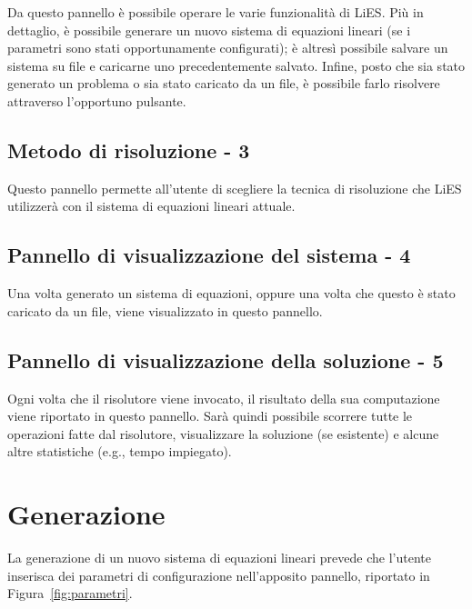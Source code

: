 \documentclass{article}
\begin{document}
Da questo pannello è possibile operare le varie funzionalità di LiES. Più in dettaglio, è possibile generare un nuovo sistema di equazioni lineari (se i parametri sono stati opportunamente configurati); è altresì possibile salvare un sistema su file e caricarne uno precedentemente salvato. Infine, posto che sia stato generato un problema o sia stato caricato da un file, è possibile farlo risolvere attraverso l'opportuno pulsante.

\subsection{Metodo di risoluzione - 3}

Questo pannello permette all'utente di scegliere la tecnica di risoluzione che LiES utilizzerà con il sistema di equazioni lineari attuale.

\subsection{Pannello di visualizzazione del sistema - 4}

Una volta generato un sistema di equazioni, oppure una volta che questo è stato caricato da un file, viene visualizzato in questo pannello.

\subsection{Pannello di visualizzazione della soluzione - 5}

Ogni volta che il risolutore viene invocato, il risultato della sua computazione viene riportato in questo pannello. Sarà quindi possibile scorrere tutte le operazioni fatte dal risolutore, visualizzare la soluzione (se esistente) e alcune altre statistiche (e.g., tempo impiegato).


\section{Generazione}
\label{sec:generazione}

La generazione di un nuovo sistema di equazioni lineari prevede che l'utente inserisca dei parametri di configurazione nell'apposito pannello, riportato in Figura~\ref{fig:parametri}.
\end{document}
